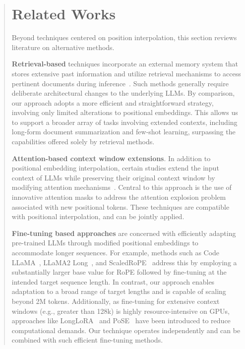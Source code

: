 \begin{abstract}
\section{Related Works}

Beyond techniques centered on position interpolation, this section reviews literature on alternative methods.

\textbf{Retrieval-based} techniques incorporate an external memory system that stores extensive past information and utilize retrieval mechanisms to access pertinent documents during inference~\cite{longllama,wang2023augmenting,borgeaud2022improving}. Such methods generally require deliberate architectural changes to the underlying LLMs. By comparison, our approach adopts a more efficient and straightforward strategy, involving only limited alterations to positional embeddings. This allows us to support a broader array of tasks involving extended contexts, including long-form document summarization and few-shot learning, surpassing the capabilities offered solely by retrieval methods.

\textbf{Attention-based context window extensions}. In addition to positional embedding interpolation, certain studies extend the input context of LLMs while preserving their original context window by modifying attention mechanisms~\cite{han2023lminfinite, streamingllm,parallelwindow}. Central to this approach is the use of innovative attention masks to address the attention explosion problem associated with new positional tokens. These techniques are compatible with positional interpolation, and can be jointly applied.

\textbf{Fine-tuning based approaches} are concerned with efficiently adapting pre-trained LLMs through modified positional embeddings to accommodate longer sequences. For example, methods such as Code LLaMA~\cite{codellama}, LLaMA2 Long~\cite{xiong2023effective}, and ScaledRoPE~\cite{liu2023scaling} address this by employing a substantially larger base value for RoPE followed by fine-tuning at the intended target sequence length. In contrast, our approach enables adaptation to a broad range of target lengths and is capable of scaling beyond 2M tokens. Additionally, as fine-tuning for extensive context windows (e.g., greater than 128k) is highly resource-intensive on GPUs, approaches like LongLoRA~\cite{longlora} and PoSE~\cite{zhu2023pose} have been introduced to reduce computational demands. Our technique operates independently and can be combined with such efficient fine-tuning methods.


\end{abstract}
